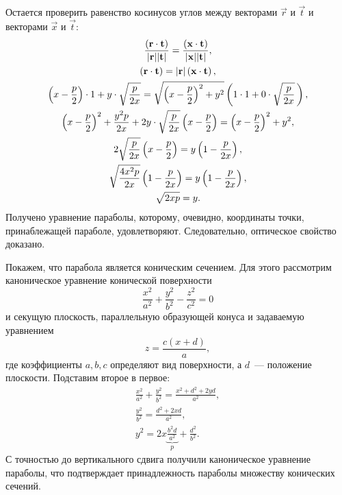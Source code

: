 Остается проверить равенство косинусов углов между векторами $\vec r$ и $\vec t$ и векторами $\vec x$ и $\vec t$:
\begin{gather*}
	\frac{\left(\mathbf{r} \cdot \mathbf{t}\right)}{|\mathbf{r}| | \mathbf{t}|} = \frac{\left(\mathbf{x} \cdot \mathbf{t}\right)}{|\mathbf{x}| |\mathbf{t}|},\\
	\left(\mathbf{r} \cdot \mathbf{t}\right) = |\mathbf{r}| \left(\mathbf{x} \cdot \mathbf{t}\right),\\
	\left(x - \frac{p}{2}\right)\cdot 1 + y \cdot \sqrt{\frac{p}{2x}}  = \sqrt{\left( x - \frac{p}{2} \right)^2 + y^2 } \left(1 \cdot 1 + 0 \cdot \sqrt{\frac{p}{2x}} \,\right),\\
	\left(x - \frac{p}{2}\right)^2 + \frac{y^2 p}{2x} + 2 y \cdot \sqrt{\frac{p}{2x}} \left(x - \frac{p}{2}\right) = \left(x - \frac{p}{2}\right)^2 + y^2,\\
	2  \sqrt{\frac{p}{2x}} \left(x - \frac{p}{2}\right) =  y \left( 1 - \frac{p}{2x} \right),\\
	 \sqrt{\frac{4x^2p}{2x}} \left(1 - \frac{p}{2x}\right) =  y \left( 1 - \frac{p}{2x} \right),\\
	 \sqrt{2xp}  =  y.
\end{gather*}
Получено уравнение параболы, которому, очевидно, координаты точки, принаблежащей параболе, удовлетворяют. Следовательно, оптическое свойство доказано.

Покажем, что парабола является коническим сечением. Для этого рассмотрим каноническое уравнение конической поверхности
\begin{equation*}
	\frac{x^2}{a^2} + \frac{y^2}{b^2} - \frac{z^2}{c^2} = 0
\end{equation*}
и секущую плоскость, параллельную образующей конуса и задаваемую уравнением
\begin{equation*}
	z = \frac{c(x + d)}{a},
\end{equation*}
где коэффициенты $a, b, c$ определяют вид поверхности, а $d$~--- положение плоскости. Подставим второе в первое:
\begin{gather*}
	\frac{x^2}{a^2} + \frac{y^2}{b^2} = \frac{x^2 + d^2 + 2yd}{a^2},\\
	\frac{y^2}{b^2} = \frac{d^2 + 2xd}{a^2},\\
	y^2 = 2 x \underbrace{\frac{b^2d}{a^2}}_p + \frac{d^2}{b^2}.
\end{gather*}
С точностью до вертикального сдвига получили каноническое уравнение параболы, что подтверждает принадлежность параболы множеству конических сечений.











